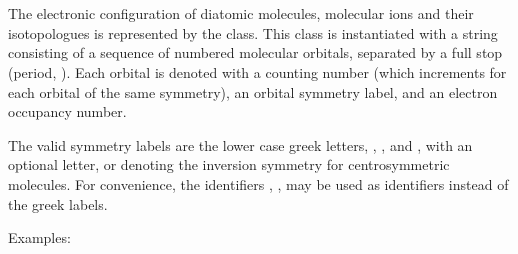 \documentclass[letterpaper,10pt,english]{sphinxmanual}
\begin{document}
\begin{sphinxVerbatim}[commandchars=\\\{\}]
 \PYG{p}{[}\PYG{p}{]}   
             
\end{sphinxVerbatim}


\section{}
\label{\detokenize{states:diatomicmolecularconfiguration}}
The electronic configuration of diatomic molecules, molecular ions and their isotopologues is represented by the  class. This class is instantiated with a string consisting of a sequence of numbered molecular orbitals, separated by a full stop (period, ).  Each orbital is denoted with a counting number (which increments for each orbital of the same symmetry), an orbital symmetry label, and an electron occupancy number.

The valid symmetry labels are the lower case greek letters, , , and , with an optional letter,  or  denoting the inversion symmetry for centrosymmetric molecules. For convenience, the identifiers , ,  may be used as identifiers instead of the greek labels.

Examples:
\end{document}
